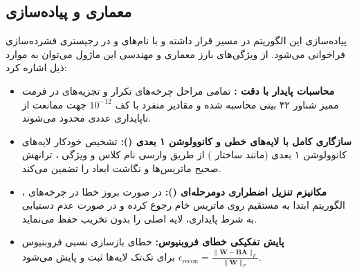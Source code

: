 \subsection{معماری و پیاده‌سازی}
پیاده‌سازی این الگوریتم در مسیر  قرار داشته و با نام‌های  و  در رجیستری فشرده‌سازی فراخوانی می‌شود. از ویژگی‌های بارز معماری و مهندسی این ماژول می‌توان به موارد ذیل اشاره کرد:
\begin{itemize}
    \item \textbf{محاسبات پایدار با دقت :} تمامی مراحل چرخه‌های تکرار  و تجزیه‌های  در فرمت ممیز شناور ۳۲ بیتی محاسبه شده و مقادیر منفرد با کف $10^{-12}$ جهت ممانعت از ناپایداری عددی محدود می‌شوند.
    \item \textbf{سازگاری کامل با لایه‌های خطی و کانوولوشن ۱ بعدی ():} تشخیص خودکار لایه‌های کانوولوشن ۱ بعدی (مانند ساختار ) از طریق وارسی نام کلاس و ویژگی ، ترانهش صحیح ماتریس‌ها و نگاشت ابعاد را تضمین می‌کند.
    \item \textbf{مکانیزم تنزیل اضطراری دومرحله‌ای ():} در صورت بروز خطا در چرخه‌های ، الگوریتم ابتدا به  مستقیم روی ماتریس خام رجوع کرده و در صورت عدم دستیابی به شرط پایداری، لایه اصلی را بدون تخریب حفظ می‌نماید.
    \item \textbf{پایش تفکیکی خطای فروبنیوس:} خطای بازسازی نسبی فروبنیوس $\epsilon_{\text{recon}} = \frac{\|\mathbf{W} - \mathbf{B} \mathbf{A}\|_F}{\|\mathbf{W}\|_F}$ برای تک‌تک لایه‌ها ثبت و پایش می‌شود.
\end{itemize}
